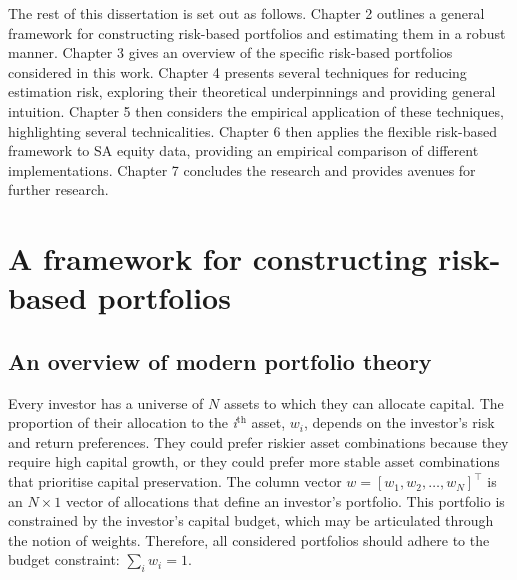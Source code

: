 \documentclass[
]{article}
\begin{document}
The rest of this dissertation is set out as follows. Chapter 2 outlines a general framework for
constructing risk-based portfolios and estimating them in a robust manner. Chapter 3 gives an
overview of the specific risk-based portfolios considered in this work. Chapter 4 presents several
techniques for reducing estimation risk, exploring their theoretical underpinnings and providing
general intuition. Chapter 5 then considers the empirical application of these techniques,
highlighting several technicalities. Chapter 6 then applies the flexible risk-based framework to SA
equity data, providing an empirical comparison of different implementations. Chapter 7 concludes the
research and provides avenues for further research.

\hypertarget{genframework}{%
\section{A framework for constructing risk-based portfolios}\label{genframework}}

\hypertarget{mpt}{%
\subsection{An overview of modern portfolio theory}\label{mpt}}

Every investor has a universe of \(N\) assets to which they can allocate capital. The proportion of
their allocation to the \emph{i}\(^{\text{th}}\) asset, \(w_i\), depends on the investor's risk and return
preferences. They could prefer riskier asset combinations because they require high capital growth,
or they could prefer more stable asset combinations that prioritise capital preservation. The column
vector \(w = [w_1,w_2,\text{…},w_N]^\intercal\) is an \(N \times 1\) vector of allocations that define an
investor's portfolio. This portfolio is constrained by the investor's capital budget, which may be
articulated through the notion of weights. Therefore, all considered portfolios should adhere to the
budget constraint: \(\sum_i w_i = 1\).
\end{document}
